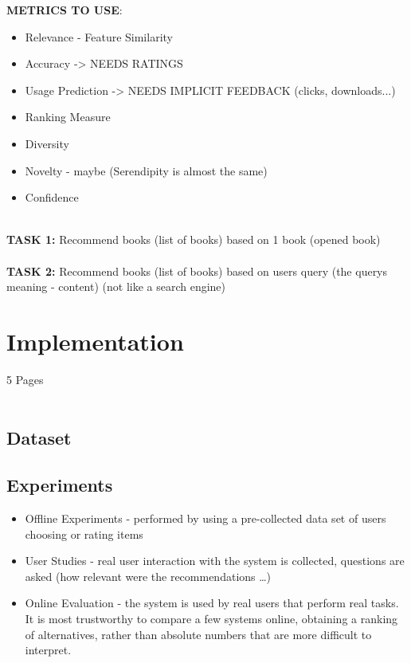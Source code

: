\documentclass[\myFontSize,oneside,english,hidelinks,a4paper]{article}
\begin{document}
\clearpage
\textbf{METRICS TO USE}:
\begin{itemize}
\item Relevance - Feature Similarity

\item Accuracy -> NEEDS RATINGS
\item Usage Prediction -> NEEDS IMPLICIT FEEDBACK (clicks, downloads...)

\item Ranking Measure
\item Diversity
\item Novelty - maybe (Serendipity is almost the same)
\item Confidence\\\\
\end{itemize}



\textbf{TASK 1:} Recommend books (list of books) based on 1 book (opened book)\\\\
\textbf{TASK 2:} Recommend books (list of books) based on users query (the querys meaning - content) (not like a search engine)\\









\clearpage
\thispagestyle{empty}
\mbox{}




\clearpage{}
\section{Implementation}
5 Pages\\\\

\subsection{Dataset}

\subsection{Experiments}
\cite{Gunawardana2022547}
%
\begin{itemize}
\item Offline Experiments - performed by using a pre-collected data set of users choosing or rating items
\item User Studies - real user interaction with the system is collected, questions are asked (how relevant were the recommendations …)
\item Online Evaluation - the system is used by real users that perform real tasks. It is most trustworthy to compare a few systems online, obtaining a ranking of alternatives, rather than absolute numbers that are more difficult to interpret.
\end{itemize}
\end{document}

